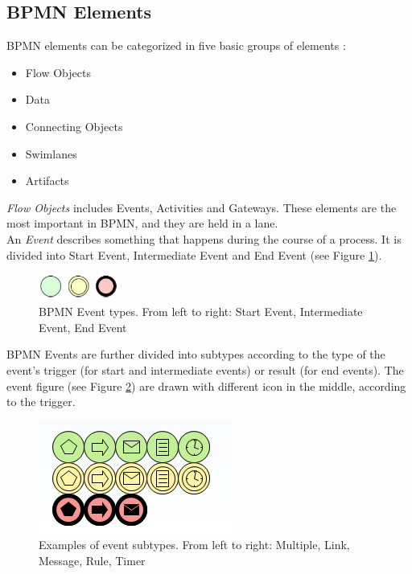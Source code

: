 \subsection{BPMN Elements}
BPMN elements can be categorized in five basic groups of elements\cite{BPMN2} :
\begin{itemize}
	\item Flow Objects
	\item Data
	\item Connecting Objects
	\item Swimlanes
	\item Artifacts
\end{itemize}
\textit{Flow Objects} includes Events, Activities and Gateways. These elements are the most important in BPMN, and they are held in a lane.\\

An \textit{Event} describes something that happens during the course of a process. It is divided into Start Event, Intermediate Event and End Event (see Figure \ref{fig:events}).\\
\begin{figure}[h]
	\centering
	\includegraphics[width=0.25\textwidth]{images/events.png}
	\caption{BPMN Event types. From left to right: Start Event, Intermediate Event, End Event}
	\label{fig:events}
\end{figure}

BPMN Events are further divided into subtypes according to the type of the event's trigger (for start and intermediate events) or result (for end events). The event figure (see Figure \ref{fig:event_subtypes}) are drawn with different icon in the middle, according to the trigger.
\begin{figure}[htbp]
	\centering
	\includegraphics{images/event_types.png}
	\caption{Examples of event subtypes. From left to right: Multiple, Link, Message, Rule, Timer}
	\label{fig:event_subtypes}
\end{figure}

